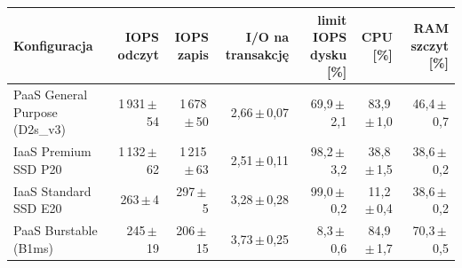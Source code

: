 \begin{tabular}{lrrrrrr}
\toprule
Konfiguracja & IOPS odczyt & IOPS zapis & I/O na transakcję & limit IOPS dysku [\%] & CPU [\%] & RAM szczyt [\%] \\
\midrule
PaaS General Purpose (D2s\_v3) & 1\,931\,$\pm$\,54 & 1\,678\,$\pm$\,50 & 2,66\,$\pm$\,0,07 & 69,9\,$\pm$\,2,1 & 83,9\,$\pm$\,1,0 & 46,4\,$\pm$\,0,7 \\
IaaS Premium SSD P20 & 1\,132\,$\pm$\,62 & 1\,215\,$\pm$\,63 & 2,51\,$\pm$\,0,11 & 98,2\,$\pm$\,3,2 & 38,8\,$\pm$\,1,5 & 38,6\,$\pm$\,0,2 \\
IaaS Standard SSD E20 & 263\,$\pm$\,4 & 297\,$\pm$\,5 & 3,28\,$\pm$\,0,28 & 99,0\,$\pm$\,0,2 & 11,2\,$\pm$\,0,4 & 38,6\,$\pm$\,0,2 \\
PaaS Burstable (B1ms) & 245\,$\pm$\,19 & 206\,$\pm$\,15 & 3,73\,$\pm$\,0,25 & 8,3\,$\pm$\,0,6 & 84,9\,$\pm$\,1,7 & 70,3\,$\pm$\,0,5 \\
\bottomrule
\end{tabular}
